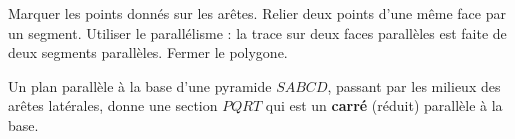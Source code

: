 Marquer les points donnés sur les arêtes. Relier deux points d'une même face par un
segment. Utiliser le parallélisme : la trace sur deux faces parallèles est faite de
deux segments parallèles. Fermer le polygone.
\begin{exemple}
Un plan parallèle à la base d'une pyramide $SABCD$, passant par les milieux des
arêtes latérales, donne une section $PQRT$ qui est un \textbf{carré} (réduit) parallèle
à la base.
\end{exemple}
